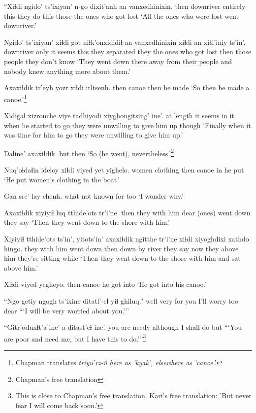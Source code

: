 \documentclass[12pt]{article}
\begin{document}
\gll ``Xiɬdi ngido'  ts'ixiyan' n-go dixit'anh an  vanxedhinixin.
then  downriver entirely this {they do this} those {the ones who got lost}
\glt `All the ones who were lost went downriver.'
\glend

\gll Ngido'  ts'ixiyan' xiɬdi  got niɬk'onxididiɬ  an vanxedhinixin xiɬdi an {xitl'iniy ts'in'.}
downriver only  {it seems} this {they separated} they {the ones who got lost} then {those people} {they don't know}
\glt `They went down there away from their people and nobody knew anything more about them.'
\glend

\gll Axaxiɬdik {tr'eyh yozr} xiɬdi itltsenh.
then  canoe   then {he made}
\glt `So then he made a canoe.'\footnote{Chapman translates \em triyuˊrz-\^u \em here as `kyak', elsewhere as `canoe'.}
\glend

\gll Xidigaɬ xizronche viye tadhiyodi xiyghongitsing'   ine'.
{at length} {it seems} {in it} {when he started to go} {they were unwilling to give him up} though
\glt `Finally when it was time for him to go they were unwilling to give him up.'
\glend

\gll Daɬine' axaxiɬdik.
but then
\glt `So (he went), nevertheless.'\footnote{Chapman's free translation}
\glend

\gll Nuq'oɬdaɬin ideloy  xiɬdi viyed yet yighelo.
women clothing then canoe in {he put}
\glt `He put women's clothing in the boat.'
\glend

\gll Gan sre' lay chenh.
what {not known} for too
\glt `I wonder why.'
\glend

\gll Axaxiɬdik xiyiyiɬ luq tthide'ots tr'i'ne.
then  {they with him} {dear (ones)} {went down} {they say}
\glt `Then they went down to the shore with him.'
\glend

\gll Xiyiyiɬ tthide'ots ts'in', yitots'in' axaxiɬdik ngitthe tr'i'ne xiɬdi xiyoghdixi xathdo hingo.
{they with him} {went down} {} then {down by river} {they say} now {} {they above him} {they're sitting} while
\glt `Then they went down to the shore with him and sat above him.'
\glend

\gll Xiɬdi viyed yegheyo.
then canoe {he got into}
\glt `He got into his canoe.'
\glend

\gll ``Ngo getiy ngogh {ts'ixine ditatl'-eɬ} yiɬ ghiluq.''
well very {for you} {I'll worry} too dear
\glt ```I will be very worried about you.'''
\glend

\gll ``Gitr'oduxɬt'a ine' a  ditast'eɬ  ine'.
{you are needy} although {} {I shall do} but
\glt ```You are poor and need me, but I have this to do.'''\footnote{This is close to Chapman's free translation. Kari's free translation:  'But never fear I will come back soon.'}
\glend
\end{document}
